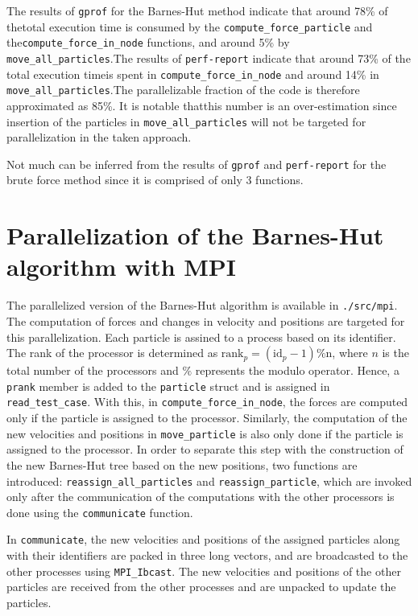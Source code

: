 \documentclass[10pt,journal,compsocconf]{IEEEtran}
\newcommand{\code}[1]{\texttt{#1}}
\begin{document}
The results of \code{gprof} for the Barnes-Hut method indicate that around 78\% of thetotal execution time is consumed by the \code{compute\_force\_particle} and the\code{compute\_force\_in\_node} functions, and around 5\% by \code{move\_all\_particles}.The results of \code{perf-report} indicate that around 73\% of the total execution timeis spent in \code{compute\_force\_in\_node} and around 14\% in \code{move\_all\_particles}.The parallelizable fraction of the code is therefore approximated as 85\%. It is notable thatthis number is an over-estimation since insertion of the particles in \code{move\_all\_particles} will not be targeted for parallelization in the taken approach.

Not much can be inferred from the results of \code{gprof} and \code{perf-report} for the brute force method since it is comprised of only 3 functions.

\section{Parallelization of the Barnes-Hut algorithm with MPI}

The parallelized version of the Barnes-Hut algorithm is available in \code{./src/mpi}. The computation of forces and changes in velocity and positions are targeted for this parallelization. Each particle is assined to a process based on its identifier. The rank of the processor is determined as $\text{rank}_p = (\text{id}_p - 1) \% \text{n}$, where $n$ is the total number of the processors and $\%$ represents the modulo operator. Hence, a \code{prank} member is added to the \code{particle} struct and is assigned in \code{read\_test\_case}. With this, in \code{compute\_force\_in\_node}, the forces are computed only if the particle is assigned to the processor. Similarly, the computation of the new velocities and positions in \code{move\_particle} is also only done if the particle is assigned to the processor. In order to separate this step with the construction of the new Barnes-Hut tree based on the new positions, two functions are introduced: \code{reassign\_all\_particles} and \code{reassign\_particle}, which are invoked only after the communication of the computations with the other processors is done using the \code{communicate} function.

In \code{communicate}, the new velocities and positions of the assigned particles along with their identifiers are packed in three long vectors, and are broadcasted to the other processes using \code{MPI\_Ibcast}. The new velocities and positions of the other particles are received from the other processes and are unpacked to update the particles.
\end{document}
